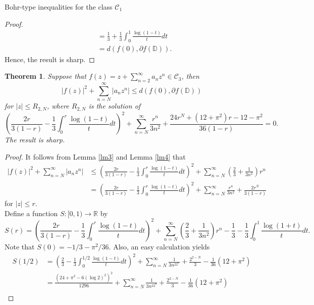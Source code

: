 \documentclass[12pt,a4paper,reqno]{amsart}
\theoremstyle{definition}
\theoremstyle{plain}
\newtheorem{theorem}[definition]{Theorem}
\numberwithin{equation}{section}
\begin{document}
\begin{section}{Bohr-type inequalities for the class $\mathcal{C}_1$}
\begin{proof}
\begin{align*}
 &=\frac{1}{3} + \frac{1}{3} \int_{0}^{1} \frac{\log(1-t)}{t} dt\\
 &=d(f(0), \partial{f(\mathbb{D})}).
\end{align*}
Hence, the result is sharp.
\end{proof}
\begin{theorem}
Suppose that $f(z)=z + \sum_{n=2}^{\infty} a_n z^n \in \mathcal{C}_3$, then
\begin{equation} \label{2.3.4}
|f(z)|^2+ \sum_{n=N}^{\infty} |a_n z^n|  \le d(f(0), \partial{f(\mathbb{D})})
\end{equation}
for $|z| \le R_{2,N}$, where $R_{2,N}$ is the solution of
\begin{equation*}
\left(
\frac{2r}{3(1-r)}-\frac{1}{3} \int_{0}^{r} \frac{\log(1-t)}{t} dt
\right)^2
+ \sum_{n=N}^{\infty}   \frac{r^{n}}{3n^2}  +\frac{ 24 r^N+(12 +\pi ^2)r-12-\pi ^2  }{36 (1-r)}=0.
\end{equation*}
The result is sharp.
\end{theorem}
\begin{proof}
It follows from Lemma \ref{lm3} and Lemma \ref{lm4} that
\begin{align*}
|f(z)|^2+ \sum_{n=N}^{\infty} |a_n z^n| & \le \left( \frac{2r}{3(1-r)}-\frac{1}{3} \int_{0}^{r} \frac{\log(1-t)}{t} dt \right)^2 + \sum_{n=N}^{\infty} \left( \frac{2}{3} + \frac{1}{3n^2} \right) r^{n}\\
&=\left( \frac{2r}{3(1-r)}-\frac{1}{3} \int_{0}^{r} \frac{\log(1-t)}{t} dt \right)^2 + \sum_{n=N}^{\infty} \frac{r^{n}}{3n^2}+\frac{2 r^N}{3(1-r)}
\end{align*}
for $|z| \le r$.
\\
\noindent
Define a function $S:[0, 1)\rightarrow\mathbb{R}$ by
\begin{equation*}
S(r)=\left( \frac{2r}{3(1-r)}-\frac{1}{3} \int_{0}^{r} \frac{\log(1-t)}{t} dt \right)^2+ \sum_{n=N}^{\infty} \left( \frac{2}{3} + \frac{1}{3n^2} \right) r^{n} -\frac{1}{3}- \frac{1}{3} \int_{0}^{1} \frac{\log(1+t)}{t} dt.
\end{equation*}
Note that
$S(0)=-{1}/{3}-{\pi ^2}/{36}$.
Also, an easy calculation yields
\begin{align*}
S(1/2)&=\left( \frac{2}{3}-\frac{1}{3} \int_{0}^{1/2} \frac{\log(1-t)}{t} dt \right)^2+ \sum_{n=N}^{\infty}  \frac{1}{3n^22^n}  +\frac{2^{2-N}}{3}-\frac{1}{36} \left(12+\pi ^2\right)\\
&=\frac{\left(24+\pi ^2-6 (\log2)^2\right)^2}{1296}+ \sum_{n=N}^{\infty}  \frac{1}{3n^22^n}  +\frac{2^{2-N}}{3}-\frac{1}{36} \left(12+\pi ^2\right)\\

\end{align*}
\end{proof}
\end{section}
\end{document}
